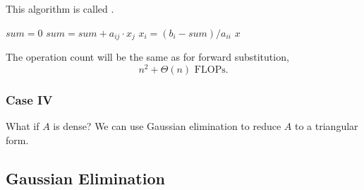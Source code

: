 This algorithm is called .

\begin{algorithm}[H]
    \begin{algorithmic}
        \State \( sum = 0 \)
        \State \( sum = sum + a_{ij} \cdot x_j \)
        \EndFor
        \State \( x_i = (b_i - sum) / a_{ii} \)
        \EndFor
        \State \Return \( x \)
        \EndFunction
    \end{algorithmic}
\end{algorithm}

The operation count will be the same as for forward substitution, \[
    n^2 + \Theta(n) \text{ FLOPs}.
\]

\subsubsection{Case IV}

What if \( A \) is dense? We can use Gaussian elimination to reduce \( A \) to a triangular form.

\subsection{Gaussian Elimination}

